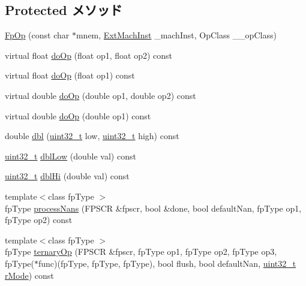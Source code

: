 \subsection*{Protected メソッド}
\begin{DoxyCompactItemize}
\item 
\hyperlink{classArmISA_1_1FpOp_ad806871f6f7f01a9f4f4f4326f6d3f70}{FpOp} (const char $\ast$mnem, \hyperlink{classStaticInst_a5605d4fc727eae9e595325c90c0ec108}{ExtMachInst} \_\-machInst, OpClass \_\-\_\-opClass)
\item 
virtual float \hyperlink{classArmISA_1_1FpOp_ae6e7fab9137bf946035338c924967bde}{doOp} (float op1, float op2) const 
\item 
virtual float \hyperlink{classArmISA_1_1FpOp_aec4d44856f9781717b36125acfcc45d3}{doOp} (float op1) const 
\item 
virtual double \hyperlink{classArmISA_1_1FpOp_a42bfa4e0c737bc1df68d12362d927535}{doOp} (double op1, double op2) const 
\item 
virtual double \hyperlink{classArmISA_1_1FpOp_ad1ec33e89716d3410e023846aaab378e}{doOp} (double op1) const 
\item 
double \hyperlink{classArmISA_1_1FpOp_a8b883fad84db432c4e6291c8db223e5e}{dbl} (\hyperlink{Type_8hh_a435d1572bf3f880d55459d9805097f62}{uint32\_\-t} low, \hyperlink{Type_8hh_a435d1572bf3f880d55459d9805097f62}{uint32\_\-t} high) const 
\item 
\hyperlink{Type_8hh_a435d1572bf3f880d55459d9805097f62}{uint32\_\-t} \hyperlink{classArmISA_1_1FpOp_af317a029a04e1eb855f20b3c76aa2d79}{dblLow} (double val) const 
\item 
\hyperlink{Type_8hh_a435d1572bf3f880d55459d9805097f62}{uint32\_\-t} \hyperlink{classArmISA_1_1FpOp_a0a20a848b3881593f6250834f4c4e53d}{dblHi} (double val) const 
\item 
{\footnotesize template$<$class fpType $>$ }\\fpType \hyperlink{classArmISA_1_1FpOp_a0bb9efaddc2b7ac41cd08d497657e092}{processNans} (FPSCR \&fpscr, bool \&done, bool defaultNan, fpType op1, fpType op2) const 
\item 
{\footnotesize template$<$class fpType $>$ }\\fpType \hyperlink{classArmISA_1_1FpOp_a90767d472cab7e40d318351bf1aa8c12}{ternaryOp} (FPSCR \&fpscr, fpType op1, fpType op2, fpType op3, fpType($\ast$func)(fpType, fpType, fpType), bool flush, bool defaultNan, \hyperlink{Type_8hh_a435d1572bf3f880d55459d9805097f62}{uint32\_\-t} \hyperlink{namespaceArmISA_a6a8214ac21eb2991c2975c0380f64b82}{rMode}) const 

\end{DoxyCompactItemize}
